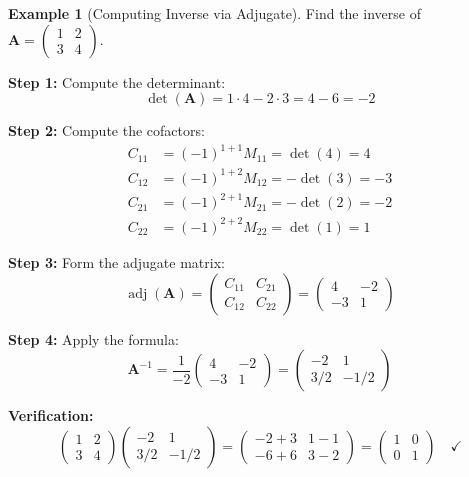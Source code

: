 \documentclass[12pt]{article}
\numberwithin{equation}{section}
\newcommand{\mat}[1]{\mathbf{#1}}        %
\newcommand{\adj}{\operatorname{adj}}
\theoremstyle{plain}
\theoremstyle{definition}
\newtheorem{example}[theorem]{Example}
\theoremstyle{remark}
\begin{document}
\begin{example}[Computing Inverse via Adjugate]
Find the inverse of $\mat{A} = \begin{pmatrix} 1 & 2 \\ 3 & 4 \end{pmatrix}$.

\textbf{Step 1:} Compute the determinant:
$$\det(\mat{A}) = 1 \cdot 4 - 2 \cdot 3 = 4 - 6 = -2$$

\textbf{Step 2:} Compute the cofactors:
\begin{align}
C_{11} &= (-1)^{1+1}M_{11} = \det(4) = 4\\
C_{12} &= (-1)^{1+2}M_{12} = -\det(3) = -3\\
C_{21} &= (-1)^{2+1}M_{21} = -\det(2) = -2\\
C_{22} &= (-1)^{2+2}M_{22} = \det(1) = 1
\end{align}

\textbf{Step 3:} Form the adjugate matrix:
$$\adj(\mat{A}) = \begin{pmatrix} C_{11} & C_{21} \\ C_{12} & C_{22} \end{pmatrix} = \begin{pmatrix} 4 & -2 \\ -3 & 1 \end{pmatrix}$$

\textbf{Step 4:} Apply the formula:
$$\mat{A}^{-1} = \frac{1}{-2}\begin{pmatrix} 4 & -2 \\ -3 & 1 \end{pmatrix} = \begin{pmatrix} -2 & 1 \\ 3/2 & -1/2 \end{pmatrix}$$

\textbf{Verification:}
$$\begin{pmatrix} 1 & 2 \\ 3 & 4 \end{pmatrix}\begin{pmatrix} -2 & 1 \\ 3/2 & -1/2 \end{pmatrix} = \begin{pmatrix} -2 + 3 & 1 - 1 \\ -6 + 6 & 3 - 2 \end{pmatrix} = \begin{pmatrix} 1 & 0 \\ 0 & 1 \end{pmatrix} \quad \checkmark$$
\end{example}
\end{document}
